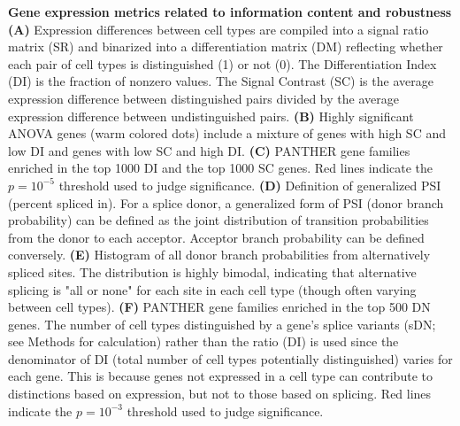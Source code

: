 \textbf{Gene expression metrics related to information content and robustness}
\textbf{(A)} Expression differences between cell types are compiled into a signal ratio matrix (SR) and binarized into a differentiation matrix (DM) reflecting whether each pair of cell types is distinguished (1) or not (0). The Differentiation Index (DI) is the fraction of nonzero values. The Signal Contrast (SC) is the average expression difference between distinguished pairs divided by the average expression difference between undistinguished pairs. 
\textbf{(B)} Highly significant ANOVA genes (warm colored dots) include a mixture of genes with high SC and low DI and genes with low SC and high DI. 
\textbf{(C)} PANTHER \citep{Thomas_2003} gene families enriched in the top 1000 DI and the top 1000 SC genes. Red lines indicate the $p=10^{-5}$ threshold used to judge significance.
\textbf{(D)} Definition of generalized PSI (percent spliced in). For a splice donor, a generalized form of PSI (donor branch probability) can be defined as the joint distribution of transition probabilities from the donor to each acceptor. Acceptor branch probability can be defined conversely. 
\textbf{(E)} Histogram of all donor branch probabilities from alternatively spliced sites. The distribution is highly bimodal, indicating that alternative splicing is "all or none" for each site in each cell type (though  often varying between cell types). 
\textbf{(F)} PANTHER gene families enriched in the top 500 DN genes. The number of cell types distinguished by a gene's splice variants (sDN; see Methods for calculation) rather than the ratio (DI) is used since the denominator of DI (total number of cell types potentially distinguished) varies for each gene. This is because genes not expressed in a cell type can contribute to distinctions based on expression, but not to those based on splicing.  Red lines indicate the $p=10^{-3}$ threshold used to judge significance.

